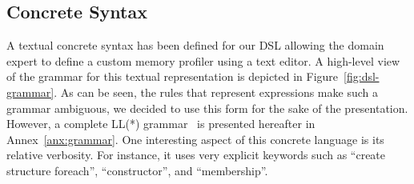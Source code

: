 \subsection{Concrete Syntax}\label{sec:concrete-syntax}

A textual concrete syntax has been defined for our DSL allowing the domain expert to define a custom memory profiler using a text editor.
A high-level view of the grammar for this textual representation is depicted in Figure~\ref{fig:dsl-grammar}.
As can be seen, the rules that represent expressions make such a grammar ambiguous, we decided to use this form for the sake of the presentation.
However, a complete LL(*) grammar~\cite{Parr:2011:LFA:1993498.1993548} is presented hereafter in Annex~\ref{anx:grammar}.
One interesting aspect of this concrete language is its relative verbosity.
For instance, it uses very explicit keywords such as ``create structure foreach'', ``constructor'', and ``membership''.


